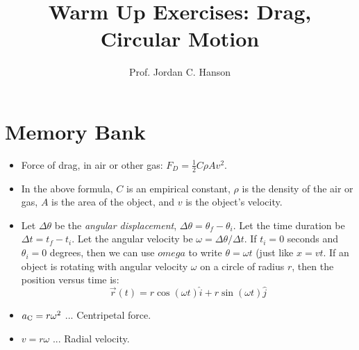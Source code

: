 \documentclass{article}
\begin{document}
\title{Warm Up Exercises: Drag, Circular Motion}
\author{Prof. Jordan C. Hanson}

\maketitle

\section{Memory Bank}

\begin{itemize}
\item Force of drag, in air or other gas: $F_D = \frac{1}{2}C \rho A v^2$.
\item In the above formula, $C$ is an empirical constant, $\rho$ is the density of the air or gas, $A$ is the area of the object, and $v$ is the object's velocity.
\item Let $\Delta\theta$ be the \textit{angular displacement}, $\Delta\theta = \theta_f - \theta_i$.  Let the time duration be $\Delta t = t_f - t_i$.  Let the angular velocity be $\omega = \Delta \theta / \Delta t$.  If $t_i = 0$ seconds and $\theta_i = 0$ degrees, then we can use $omega$ to write $\theta = \omega t$ (just like $x = v t$.  If an object is rotating with angular velocity $\omega$ on a circle of radius $r$, then the position versus time is:
\begin{equation}
\vec{r}(t) = r\cos(\omega t)\hat{i} + r\sin(\omega t)\hat{j} \label{eq:1}
\end{equation}
\item $a_{\rm C} = r \omega^2$ ... Centripetal force.
\item $v = r\omega$ ... Radial velocity.
\end{itemize}
\end{document}
